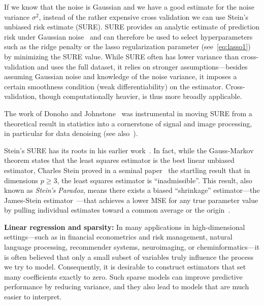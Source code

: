 \medskip

If we know that the noise is Gaussian and we have a good estimate for the noise variance $\sigma^2$, instead of the rather expensive cross validation we can use  Stein’s unbiased risk estimate (SURE). SURE  provides an analytic estimate of prediction risk under Gaussian noise~\cite{stein1981estimation}
and can therefore be used to select hyperparameters such as the ridge penalty or the lasso regularization parameter (see~\eqref{eq:lasso1}) by minimizing the SURE value. 
While SURE often has lower variance than cross-validation and uses the full dataset, it relies on stronger assumptions---besides assuming Gaussian noise and knowledge of the noise variance, it imposes  a certain smoothness condition (weak differentiability) on the estimator.  Cross-validation, though computationally heavier, is thus more broadly applicable.


The work of Donoho and Johnstone~\cite{donoho1995adapting} was 
instrumental in moving SURE from a theoretical result in statistics into a cornerstone of signal and image processing, in particular for data denoising (see also~\cite{blu2007sure}).



Stein's SURE has its roots in his earlier work~\cite{stein1956inadmissibility,james1961estimation}. In fact, while the Gauss-Markov theorem states that the least squares estimator is the best linear unbiased estimator, Charles Stein proved  in a seminal paper~\cite{stein1956inadmissibility} the startling result that in dimensions $p\ge 3$, the least squares estimator is ``inadmissible''. This result, also known as {\em Stein's Paradox}, means there exists a biased ``shrinkage'' estimator---the James-Stein estimator~\cite{james1961estimation}---that achieves a lower MSE for any true parameter value by pulling individual estimates toward a common average or the origin~\cite{gruber2017improving}.




\medskip
\noindent
\textbf{Linear regression and sparsity:}
In many applications in high-dimensional settings---such as in financial econometrics and risk management, natural language processing, recommender systems, neuroimaging, or cheminformatics---it is often believed that only a small subset of variables truly influence the process we try to model. Consequently, it is desirable to construct estimators that set many coefficients exactly to zero. Such sparse models can improve predictive performance by reducing variance, and they also lead to models that are much easier to interpret. 

